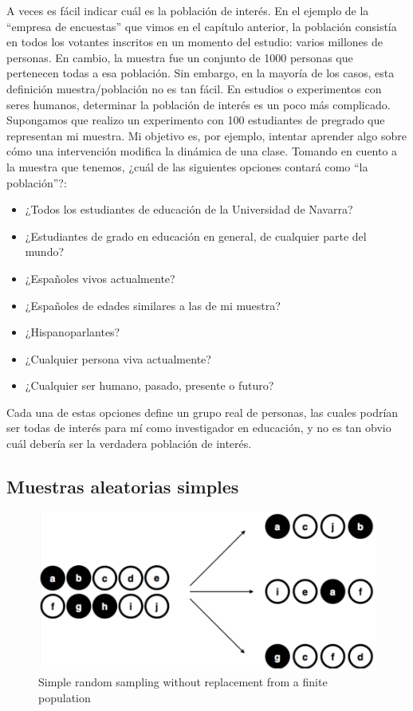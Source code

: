 \documentclass[spanish,]{book}
\providecommand{\tightlist}{%
  \setlength{\itemsep}{0pt}\setlength{\parskip}{0pt}}
\begin{document}
A veces es fácil indicar cuál es la población de interés. En el ejemplo
de la ``empresa de encuestas'' que vimos en el capítulo anterior, la
población consistía en todos los votantes inscritos en un momento del
estudio: varios millones de personas. En cambio, la muestra fue un
conjunto de 1000 personas que pertenecen todas a esa población. Sin
embargo, en la mayoría de los casos, esta definición muestra/población
no es tan fácil. En estudios o experimentos con seres humanos,
determinar la población de interés es un poco más complicado. Supongamos
que realizo un experimento con 100 estudiantes de pregrado que
representan mi muestra. Mi objetivo es, por ejemplo, intentar aprender
algo sobre cómo una intervención modifica la dinámica de una clase.
Tomando en cuento a la muestra que tenemos, ¿cuál de las siguientes
opciones contará como ``la población''?:

\begin{itemize}
\tightlist
\item
  ¿Todos los estudiantes de educación de la Universidad de Navarra?\\
\item
  ¿Estudiantes de grado en educación en general, de cualquier parte del
  mundo?\\
\item
  ¿Españoles vivos actualmente?\\
\item
  ¿Españoles de edades similares a las de mi muestra?
\item
  ¿Hispanoparlantes?
\item
  ¿Cualquier persona viva actualmente?\\
\item
  ¿Cualquier ser humano, pasado, presente o futuro?
\end{itemize}

Cada una de estas opciones define un grupo real de personas, las cuales
podrían ser todas de interés para mí como investigador en educación, y
no es tan obvio cuál debería ser la verdadera población de interés.

\subsection{Muestras aleatorias
simples}\label{muestras-aleatorias-simples}

\begin{figure}
\includegraphics[width=12.86in]{img/estimation/srs1} \caption{Simple random sampling without replacement from a finite population}\label{fig:srs1}
\end{figure}
\end{document}
